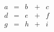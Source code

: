 $
      \begin{equation}
      \begin{aligned}
      a & = & b & + & c \\
      d & = & e & + & f \\
      g & = & h & + & i
      \end{aligned}
      \end{equation}
$
